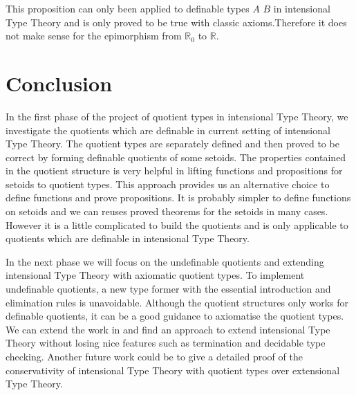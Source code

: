 \documentclass{article}
\theoremstyle{definition}
\newcommand{\R}{\mathbb{R}}
\newcommand{\itt}{intensional Type Theory}
\newcommand{\ett}{extensional Type Theory}
\begin{document}
This proposition can only been applied to definable types $A$ $B$ in \itt{} and is
only proved to be true with classic axioms.Therefore it does not make
sense for the epimorphism from $\R_0$ to $\R$.

\section{Conclusion}

In the first phase of the project of quotient types in \itt{}, we
investigate the quotients which are definable in current setting of
\itt{}. The quotient types are separately defined and then proved to
be correct by forming definable quotients of some setoids. The
properties contained in the quotient structure is very helpful in
lifting functions and propositions for setoids to quotient types. This
approach provides us an alternative choice to define functions and prove propositions. It is probably simpler to define functions on setoids and we can reuses proved theorems for the setoids in many cases. However it is a little complicated to build the quotients and is only applicable to quotients which are definable in \itt{}.

In the next phase we will focus on the undefinable quotients and
extending \itt{} with axiomatic quotient types. To implement
undefinable quotients, a new type former with the essential
introduction and elimination rules is unavoidable. Although the
quotient structures only works for definable quotients, it can be a
good guidance to axiomatise the quotient types. We can extend the work
in \cite{alt:99} and find an approach to extend \itt{} without losing
nice features such as termination and decidable type checking. Another
future work could be to give a detailed proof of the conservativity of \itt{} with quotient types over \ett{}.

% 





\newpage


\end{document}
